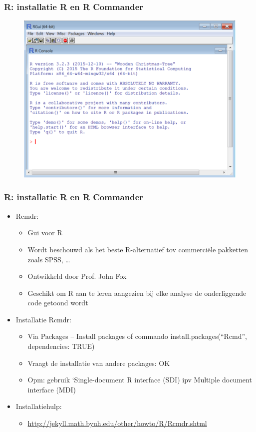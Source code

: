 \documentclass{beamer}
\begin{document}
\begin{frame}
  \frametitle{R: installatie R en R Commander}
  \begin{figure}
    \centering
    \includegraphics[width=\textwidth]{img/oef3/R-Gui-en-console}
  \end{figure}
\end{frame}

\begin{frame}
  \frametitle{R: installatie R en R Commander}
  \begin{itemize}
    \item Rcmdr:
      \begin{itemize}
        \item Gui voor R
        \item Wordt beschouwd als het beste R-alternatief tov commerciële pakketten zoals SPSS, …
        \item Ontwikkeld door Prof. John Fox
        \item Geschikt om R aan te leren aangezien bij elke analyse de onderliggende code getoond wordt
      \end{itemize}
    \item Installatie Rcmdr:
      \begin{itemize}
        \item Via Packages -- Install packages of commando install.packages(``Rcmd'', dependencies: TRUE)
        \item Vraagt de installatie van andere packages: OK
        \item Opm: gebruik ‘Single-document R interface (SDI) ipv Multiple document interface (MDI)
      \end{itemize}
    \item Installatiehulp:
      \begin{itemize}
        \item \url{http://jekyll.math.byuh.edu/other/howto/R/Rcmdr.shtml}
      \end{itemize}
  \end{itemize}
\end{frame}
\end{document}
